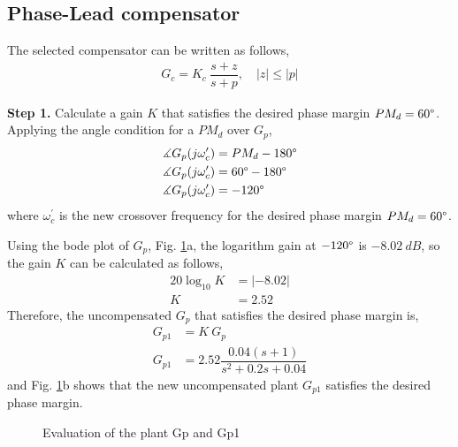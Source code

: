\documentclass[11pt, a4paper]{article}
\begin{document}
\subsection{Phase-Lead compensator}
The selected compensator can be written as follows,
\begin{align}
G_c = K_c~\dfrac{s+z}{s+p},\quad |z|\leq|p|
\end{align}

\textbf{Step 1.} Calculate a gain $K$ that satisfies the desired phase margin $PM_d=60\degree$. Applying the angle condition for a $PM_d$ over $G_p$,
\begin{align}
\measuredangle G_p(j\omega_c^\prime) &= PM_d - 180\degree \\
\measuredangle G_p(j\omega_c^\prime) &= 60\degree - 180\degree \nonumber\\
\measuredangle G_p(j\omega_c^\prime) &= -120\degree \nonumber
\end{align}
where $\omega_c^\prime$ is the new crossover frequency for the desired phase margin $PM_d=60\degree$.

Using the bode plot of $G_p$, Fig. \ref{fig:Q1_Gp_Gp1_bode}a, the logarithm gain at $-120\degree$ is $-8.02~dB$, so the gain $K$ can be calculated as follows,
\begin{align}
20\log_{10} K &= |-8.02|\\
K &= 2.52 \nonumber
\end{align}
Therefore, the uncompensated $G_p$ that satisfies the desired phase margin is,
\begin{align}
G_{p1} &= K~G_p \nonumber\\
G_{p1} &= 2.52 \dfrac{0.04(s+1)}{s^2+0.2s+0.04}
\end{align}
and Fig. \ref{fig:Q1_Gp_Gp1_bode}b shows that the new uncompensated plant $G_{p1}$ satisfies the desired phase margin.
 
\begin{figure}[H]
	\centering
	\caption{Evaluation of the plant Gp and Gp1}
	\label{fig:Q1_Gp_Gp1_bode}
\end{figure}
\end{document}
